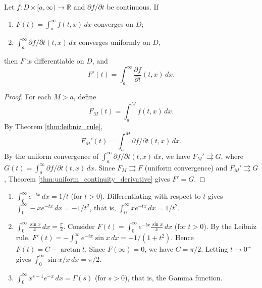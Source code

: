 \begin{theorem}\label{thm:improper_leibniz_rule}
Let $f: D \times [a, \infty) \to \mathbb{R}$ and $\partial f/\partial t$ be continuous. If
\begin{enumerate}[label=(\roman*)]
    \item $F(t) = \int_a^{\infty} f(t, x) \, dx$ converges on $D$;
    \item $\int_a^{\infty} \partial f/\partial t(t, x) \, dx$ converges uniformly on $D$,
\end{enumerate}
then $F$ is differentiable on $D$, and
\[
F'(t) = \int_a^{\infty} \frac{\partial f}{\partial t}(t, x) \, dx.
\]
\end{theorem}

\begin{proof}
For each $M > a$, define
\[
F_M(t) = \int_a^M f(t, x) \, dx.
\]
By Theorem \ref{thm:leibniz_rule},
\[
F_M'(t) = \int_a^M \partial f/\partial t(t, x) \, dx.
\]By the uniform convergence of $\int_a^{\infty} \partial f/\partial t(t, x) \, dx$, we have $F_M' \rightrightarrows G$, where $G(t) = \int_a^{\infty} \partial f/\partial t(t, x) \, dx$. Since $F_M \rightrightarrows F$ (uniform convergence) and $F_M' \rightrightarrows G$, Theorem \ref{thm:uniform_continuity_derivative} gives $F' = G$.
\end{proof}

\begin{example}\label{ex:parametric_integral_examples}
\begin{enumerate}[label=(\roman*)]
    \item $\int_0^{\infty} e^{-tx} \, dx = 1/t$ (for $t > 0$). Differentiating with respect to $t$ gives $\int_0^{\infty} -x e^{-tx} \, dx = -1/t^2$, that is, $\int_0^{\infty} x e^{-tx} \, dx = 1/t^2$.
    \item $\int_0^{\infty} \frac{\sin x}{x} \, dx = \frac{\pi}{2}$. Consider $F(t) = \int_0^{\infty} e^{-tx} \frac{\sin x}{x} \, dx$ (for $t > 0$). By the Leibniz rule, $F'(t) = -\int_0^{\infty} e^{-tx} \sin x \, dx = -1/(1 + t^2)$. Hence $F(t) = C - \arctan t$. Since $F(\infty) = 0$, we have $C = \pi/2$. Letting $t \to 0^+$ gives $\int_0^{\infty} \sin x / x \, dx = \pi/2$.
    \item $\int_0^{\infty} x^{s-1} e^{-x} \, dx = \Gamma(s)$ (for $s > 0$), that is, the Gamma function.
\end{enumerate}
\end{example}

